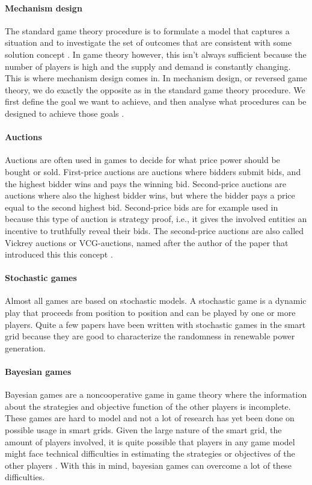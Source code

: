 \paragraph{Mechanism design}
The standard game theory procedure is to formulate a model that
captures a situation and to investigate the set of outcomes that are
consistent with some solution concept \cite{CourseInGameTheory}. In game theory however, this isn't always sufficient because the number of players is high and the supply and demand is constantly changing. This is where mechanism design comes in. In mechanism design, or reversed game theory, we do exactly the opposite as in the standard game theory procedure. We first define the goal we want to achieve, and then analyse what procedures can be designed to achieve those goals \cite{SalfatiRabinovici2014}. 
 

\paragraph{Auctions}
Auctions are often used in games to decide for what price power should be bought or sold. First-price auctions are auctions where bidders submit bids, and the highest bidder wins and pays the winning bid. Second-price auctions are auctions where also the highest bidder wins, but where the bidder pays a price equal to the second highest bid. Second-price bids are for example used in \cite{SaadHanPoorEtAl2011} because this type of auction is strategy proof, i.e., it gives the involved entities an incentive to truthfully reveal their bids. The second-price auctions are also called Vickrey auctions or VCG-auctions, named after the author of the paper that introduced this this concept \cite{Vickrey1961}.

\paragraph{Stochastic games}
Almost all games are based on stochastic models. A stochastic game is a dynamic play that proceeds from position to position \cite{Shapley1953} and can be played by one or more players. Quite a few papers have been written with stochastic games in the smart grid \cite{LiangZhuang2014} because they are good to characterize the randomness in renewable power generation.  
\paragraph{Bayesian games}
Bayesian games are a noncooperative game in game theory where the information about the strategies and objective function of the other players is incomplete. These games are hard to model and not a lot of research has yet been done on possible usage in smart grids. Given the large nature of the smart grid, the amount of players involved, it is quite possible that players in any game model might face technical difficulties in estimating the strategies or objectives of the other players \cite{keypaper}. With this in mind, bayesian games can overcome a lot of these difficulties. 

